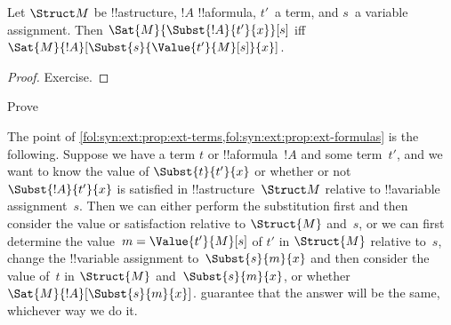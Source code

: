 \documentclass[../../../include/open-logic-section]{subfiles}
\begin{document}
\begin{prop} Let $\Struct M$ be
!!a{structure}, $!A$ !!a{formula}, $t'$~a term, and $s$~a variable
assignment. Then $\Sat{M}{\Subst{!A}{t'}{x}}[s]$ iff
$\Sat{M}{!A}[\Subst{s}{\Value{t'}{M}[s]}{x}]$.
\end{prop}

\begin{proof}
Exercise.
\end{proof}

\begin{prob}
Prove 
\end{prob}

\begin{explain}
  The point of
  \cref{fol:syn:ext:prop:ext-terms,fol:syn:ext:prop:ext-formulas} is
  the following. Suppose we have a term $t$ or !!a{formula}~$!A$ and
  some term~$t'$, and we want to know the value of $\Subst{t}{t'}{x}$
  or whether or not $\Subst{!A}{t'}{x}$ is satisfied in
  !!a{structure}~$\Struct M$ relative to !!a{variable} assignment~$s$.
  Then we can either perform the substitution first and then consider
  the value or satisfaction relative to $\Struct{M}$ and~$s$, or we
  can first determine the value~$m = \Value{t'}{M}[s]$ of $t'$ in
  $\Struct{M}$ relative to~$s$, change the !!{variable} assignment
  to~$\Subst{s}{m}{x}$ and then consider the value of~$t$ in
  $\Struct{M}$ and~$\Subst{s}{m}{x}$, or whether
  $\Sat{M}{!A}[\Subst{s}{m}{x}]$.
  guarantee that the answer will be the same, whichever way we do it.
\end{explain}
\end{document}

